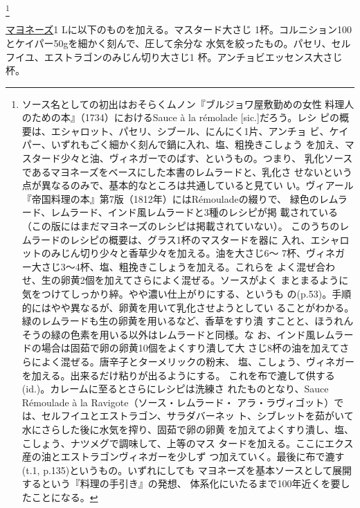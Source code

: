 \begin{recette}
\footnote{ソース名としての初出はおそらくムノン『ブルジョワ屋敷勤めの女性
  料理人のための本』（1734）におけるSauce à la rémolade
  {[}sic.{]}だろう。レシ
  ピの概要は、エシャロット、パセリ、シブール、にんにく1片、アンチョ
  ビ、ケイパー、いずれもごく細かく刻んで鍋に入れ、塩、粗挽きこしょう
  を加え、マスタード少々と油、ヴィネガーでのばす、というもの。つまり、
  乳化ソースであるマヨネーズをベースにした本書のレムラードと、乳化さ
  せないという点が異なるのみで、基本的なところは共通していると見てい
  い。ヴィアール『帝国料理の本』第7版（1812年）にはRémouladeの綴りで、
  緑色のレムラード、レムラード、インド風レムラードと3種のレシピが掲
  載されている（この版にはまだマヨネーズのレシピは掲載されていない）。
  このうちのレムラードのレシピの概要は、グラス1杯のマスタードを器に
  入れ、エシャロットのみじん切り少々と香草少々を加える。油を大さじ6〜
  7杯、ヴィネガー大さじ3〜4杯、塩、粗挽きこしょうを加える。これらを
  よく混ぜ合わせ、生の卵黄2個を加えてさらによく混ぜる。ソースがよく
  まとまるように気をつけてしっかり綷。やや濃い仕上がりにする、というも
  の(p.53)。手順的にはやや異なるが、卵黄を用いて乳化させようとしてい
  ることがわかる。緑のレムラードも生の卵黄を用いるなど、香草をすり潰
  すことと、ほうれんそうの緑の色素を用いる以外はレムラードと同様。な
  お、インド風レムラードの場合は固茹で卵の卵黄10個をよくすり潰して大
  さじ8杯の油を加えてさらによく混ぜる。唐辛子とターメリックの粉末、
  塩、こしょう、ヴィネガーを加える。出来るだけ粘りが出るようにする。
  これを布で漉して供する(id.)。カレームに至るとさらにレシピは洗練さ
  れたものとなり、Sauce Rémoulade à la Ravigote（ソース・レムラード・
  アラ・ラヴィゴット）では、セルフイユとエストラゴン、サラダバーネッ
  ト、シブレットを茹がいて水にさらした後に水気を搾り、固茹で卵の卵黄
  を加えてよくすり潰し、塩、こしょう、ナツメグで調味して、上等のマス
  タードを加える。ここにエクス産の油とエストラゴンヴィネガーを少しず
  つ加えていく。最後に布で漉す(t.1, p.135)というもの。いずれにしても
  マヨネーズを基本ソースとして展開するという『料理の手引き』の発想、
  体系化にいたるまで100年近くを要したことになる。}


\protect\hyperlink{mayonnaise}{マヨネーズ}1
Lに以下のものを加える。マスタード大さじ
1\undemi{}杯。コルニション100とケイパー50gを細かく刻んで、圧して余分な
水気を絞ったもの。パセリ、セルフイユ、エストラゴンのみじん切り大さじ1
杯。アンチョビエッセンス大さじ\undemi{}杯。


\end{recette}
